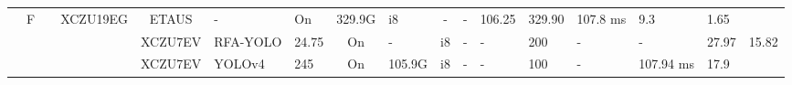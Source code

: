 \begin{table}
\begin{adjustbox}{totalheight=\baselineskip,}
\begin{tabular}{ccccclp{2em}cp{3em}cp{2em}p{4em}p{3em}p{3.5em}p{3.5em}p{2.5em}p{3em}}
       &\multirow{12}{*}{F}
           &\multirow{1}{*}{\cite{huangEdgeTrustworthyAI2024}}
               &\multirow{1}{*}{XCZU19EG}
                   &\multirow{1}{*}{ETAUS}
                       &\multirow{1}{*}{-}
                           &\multirow{1}{*}{On}
                               &\multirow{1}{*}{329.9G}
                                   &\multirow{1}{*}{i8}
                                       &\multirow{1}{*}{-}
                                           &\multirow{1}{*}{-}
                                               &\multirow{1}{*}{106.25}
                                                   &\multirow{1}{*}{329.90}
                                                       &\multirow{1}{*}{107.8 ms}
                                                           &\multirow{1}{*}{9.3}
                                                               &\multirow{1}{*}{1.65}\\
\cmidrule{4-17}
   &   &   &\multirow{1}{*}{\cite{liEdgeRealtimeObject2023a}}
               &\multirow{1}{*}{XCZU7EV}
                   &\multirow{1}{*}{RFA-YOLO}
                       &\multirow{1}{*}{24.75}
                           &\multirow{1}{*}{On}
                               &\multirow{1}{*}{-}
                                   &\multirow{1}{*}{i8}
                                       &\multirow{1}{*}{-}
                                           &\multirow{1}{*}{-}
                                               &\multirow{1}{*}{200}
                                                   &\multirow{1}{*}{-}
                                                       &\multirow{1}{*}{-}
                                                           &\multirow{1}{*}{27.97}
                                                               &\multirow{1}{*}{15.82}\\
\cmidrule{4-17}
   &   &   &\multirow{2}{*}{\cite{nguyenFPGASoCImplementationYOLOv42024}}
               &\multirow{2}{*}{XCZU7EV}
                   &\multirow{1}{*}{YOLOv4}
                       &\multirow{1}{*}{245}
                           &\multirow{1}{*}{On}
                               &\multirow{1}{*}{105.9G}
                                   &\multirow{1}{*}{i8}
                                       &\multirow{1}{*}{-}
                                           &\multirow{1}{*}{-}
                                               &\multirow{1}{*}{100}
                                                   &\multirow{1}{*}{-}
                                                       &\multirow{1}{*}{107.94 ms}
                                                           &\multirow{1}{*}{17.9}

\end{tabular}
\end{adjustbox}
\end{table}
